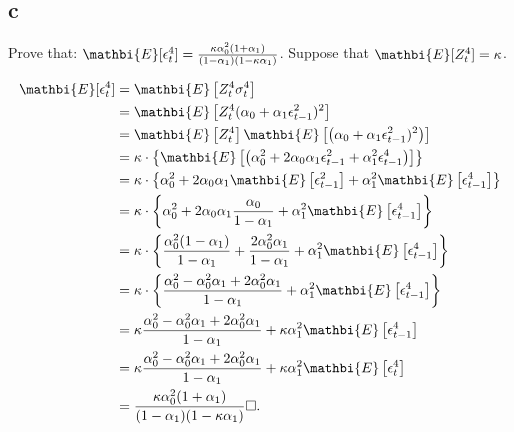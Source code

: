 \subsection{c}
\label{subsection_3_c}
Prove that: $\mathbi{E}[\epsilon^4_t] = \frac{\kappa\alpha_0^2(1+\alpha_1)}{(1-\alpha_1)(1-\kappa\alpha_1)} $.
Suppose that $\mathbi{E}[Z_t^4] = \kappa$.

\begin{solution}

\begin{equation}
\begin{aligned}
\mathbi{E}[\epsilon^4_t] & = \mathbi{E}\left[Z_t^4\sigma_t^4\right] \\
												 & = \mathbi{E}\left[Z_t^4(\alpha_0 + \alpha_1 \epsilon_{t-1}^2)^2\right] \\
												 & = \mathbi{E}\left[Z_t^4\right] \mathbi{E}\left[\left(\alpha_0 + \alpha_1 \epsilon_{t-1}^2)^2\right)\right] \\
												 & = \kappa \cdot \left\{ \mathbi{E}\left[\left(\alpha_0^2 
																																	      + 2\alpha_0\alpha_1\epsilon_{t-1}^2 
																																	      + \alpha_1^2\epsilon_{t-1}^4 \right)\right] \right\} \\
												 & = \kappa \cdot \left\{ \alpha_0^2 
																																	      + 2\alpha_0\alpha_1\mathbi{E}\left[\epsilon_{t-1}^2 \right] 
																																	      + \alpha_1^2\mathbi{E}\left[\epsilon_{t-1}^4 \right] \right\} \\
										     & = \kappa \cdot \left\{ \alpha_0^2 
																																	      + 2\alpha_0\alpha_1\frac{\alpha_0}{1 - \alpha_1} 
																																	      + \alpha_1^2\mathbi{E}\left[\epsilon_{t-1}^4 \right] \right\} \\
											   & = \kappa \cdot \left\{ \frac{\alpha_0^2(1 - \alpha_1)}{1 - \alpha_1} 
																																	      + \frac{2\alpha_0^2\alpha_1}{1 - \alpha_1} 
																																	      + \alpha_1^2\mathbi{E}\left[\epsilon_{t-1}^4 \right] \right\} \\
												& = \kappa \cdot \left\{ \frac{\alpha_0^2 - \alpha_0^2\alpha_1 + 2\alpha_0^2\alpha_1}{1 - \alpha_1} 
																																	      + \alpha_1^2\mathbi{E}\left[\epsilon_{t-1}^4 \right] \right\} \\
												& = \kappa\frac{\alpha_0^2 - \alpha_0^2\alpha_1 + 2\alpha_0^2\alpha_1}{1 - \alpha_1} 
																																	      + \kappa\alpha_1^2\mathbi{E}\left[\epsilon_{t-1}^4 \right] \\
												& = \kappa\frac{\alpha_0^2 - \alpha_0^2\alpha_1 + 2\alpha_0^2\alpha_1}{1 - \alpha_1} 
																																	      + \kappa\alpha_1^2\mathbi{E}\left[\epsilon_{t}^4 \right] \\
												& = \frac{\kappa\alpha_0^2(1 + \alpha_1)}{(1 - \alpha_1)(1 - \kappa\alpha_1)} \square.																																	     
\end{aligned}
\end{equation}

\end{solution}

